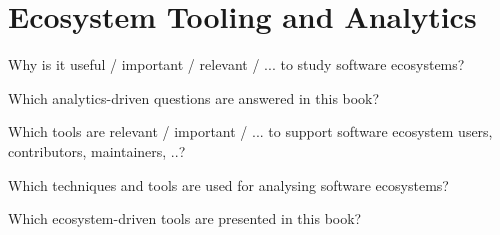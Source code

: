 \section{Ecosystem Tooling and Analytics}
\label{INT:sec:analytics}

{\color{red}

    Why is it useful / important / relevant / ... to study software ecosystems?

    Which analytics-driven questions are answered in this book?


    Which tools are relevant / important / ... to support software ecosystem users, contributors, maintainers, ..?
}




{\color{red}
    Which techniques and tools are used for analysing software ecosystems?

    Which ecosystem-driven tools are presented in this book?
}



